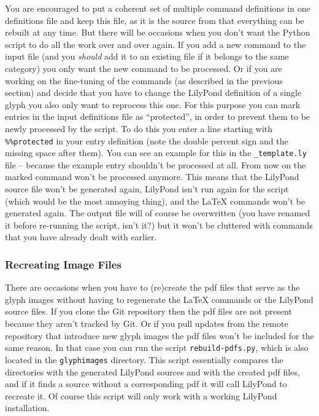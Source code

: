\documentclass{article}
\begin{document}
You are encouraged to put a coherent set of multiple command definitions in one definitions file and keep this file, as it is the source from that everything can be rebuilt at any time.
But there will be occasions when you don't want the Python script to do all the work over and over again.
If you add a new command to the input file (and you \emph{should} add it to an existing file if it belongs to the same category) you only want the new command to be processed.
Or if you are working on the fine-tuning of the commands (as described in the previous section) and decide that you have to change the LilyPond definition of a single glyph you also only want to reprocess this one.
For this purpose you can mark entries in the input definitions file as “protected”, in order to prevent them to be newly processed by the script.
To do this you enter a line starting with \verb|%%protected| in your entry definition (note the double percent sign and the missing space after them).
You can see an example for this in the \texttt{\_template.ly} file -- because the example entry shouldn't be processed at all.
From now on the marked command won't be processed anymore.
This means that the LilyPond source file won't be generated again, LilyPond isn't run again for the script (which would be the most annoying thing), and the \LaTeX{} commands won't be generated again.
The output file will of course be overwritten (you have renamed it before re-running the script, isn't it?) but it won't be cluttered with commands that you have already dealt with earlier.


\subsubsection{Recreating Image Files}
\label{subsubsec:BGI_recreating_images}

There are occasions when you have to (re)create the pdf files that serve as the glyph images without having to regenerate the \LaTeX{} commands or the LilyPond source files.
If you clone the Git repository then the pdf files are not present because they aren't tracked by Git.
Or if you pull updates from the remote repository that introduce new glyph images the pdf files won't be included for the same reason.
In that case you can run the script \texttt{rebuild-pdfs.py}, which is also located in the \texttt{glyphimages} directory.
This script essentially compares the directories with the generated LilyPond sources and with the created pdf files, and if it finds a source without a corresponding pdf it will call LilyPond to recreate it.
Of course this script will only work with a working LilyPond installation.
\end{document}
